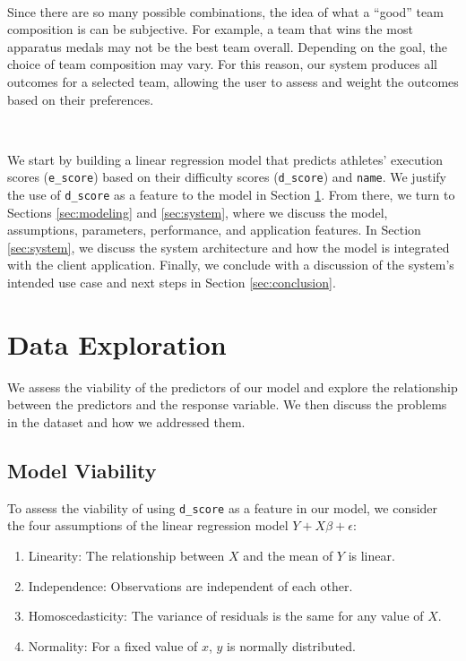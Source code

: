\documentclass{article}
\begin{document}
\

\noindent Since there are so many possible combinations, the idea of what a 
``good'' team composition is can be subjective. For example, a team that 
wins the most apparatus medals may not be the best team overall. Depending on 
the goal, the choice of team composition may vary. For this reason, our system
produces all outcomes for a selected team, allowing the user to assess and weight 
the outcomes based on their preferences.


\

\noindent We start by building a linear regression model that predicts athletes' execution scores 
(\texttt{e\_score}) based on their difficulty scores (\texttt{d\_score}) and \texttt{name}. 
We justify the use of \texttt{d\_score} as a feature to the model 
in Section \ref{sec:eda}. From there, we turn to Sections \ref{sec:modeling} and \ref{sec:system},
where we discuss the model, assumptions, parameters, performance, and application features. In Section 
\ref{sec:system}, we discuss the system architecture and how the model is integrated with the client application. 
Finally, we conclude with a discussion of the system's intended use case and 
next steps in Section \ref{sec:conclusion}. 

\section{Data Exploration}\label{sec:eda}
We assess the viability of the predictors of our model and explore the 
relationship between the predictors and the response variable. We then 
discuss the problems in the dataset and how we addressed them.

\subsection{Model Viability}
To assess the viability of using \texttt{d\_score} as a feature in our model, we
consider the four assumptions of the linear regression model $Y + X\beta + \epsilon$:
\begin{enumerate}
    \item Linearity: The relationship between $X$ and the mean of $Y$ is linear.
    \item Independence: Observations are independent of each other.
    \item Homoscedasticity: The variance of residuals is the same for any value of $X$.
    \item Normality: For a fixed value of $x$, $y$ is normally distributed.
\end{enumerate}
\end{document}
